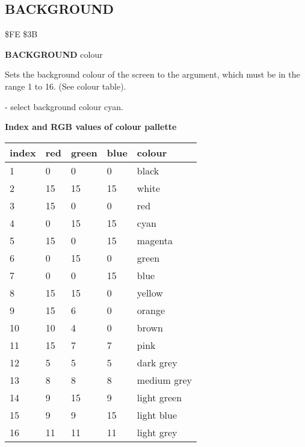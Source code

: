 
\newpage
\subsection{BACKGROUND}
\begin{description}[leftmargin=3cm,style=nextline]
\item [Token:] \$FE \$3B
\item [Format:] {\bf BACKGROUND} colour
\item [Usage:] Sets the background colour
               of the screen to the argument, which must be in the
               range 1 to 16. (See colour table).
\item [Example:]  - select background colour cyan.
\item [Colours:] {\bf Index and RGB values of colour pallette}

\ttfamily
{\setlength{\tabcolsep}{1mm}
\begin{tabular}{*{4}{|R{1.2cm}}|l|}
\hline
 index  &   red & green & blue & colour \\
 &    0  &   0   &  0   & black \\
  2 &   15  &  15   & 15   & white \\
  3 &   15  &   0   &  0   & red   \\
  4 &    0  &  15   & 15   & cyan  \\
  5 &   15  &   0   & 15   & magenta\\
  6 &    0  &  15   &  0   & green \\
  7 &    0  &   0   & 15   & blue  \\
  8 &   15  &  15   &  0   & yellow\\
  9 &   15  &   6   &  0   & orange\\
 10 &   10  &   4   &  0   & brown \\
 11 &   15  &   7   &  7   & pink  \\
 12 &    5  &   5   &  5   & dark grey\\
 13 &    8  &   8   &  8   & medium grey\\
 14 &    9  &  15   &  9   & light green \\
 15 &    9  &   9   & 15   & light blue\\
 16 &   11  &  11   & 11   & light grey\\
\hline
\end{tabular}
}
\end{description}


